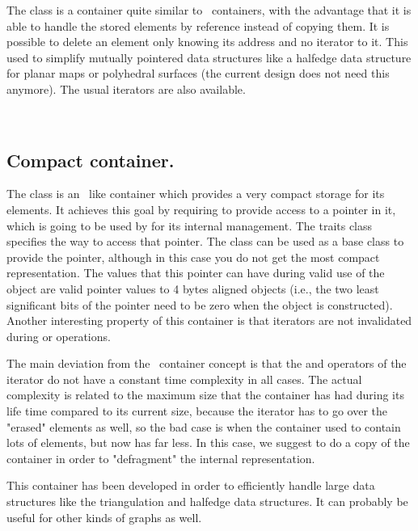 The class  is a container quite similar
to \stl\ containers, with the advantage that it is able to handle the
stored elements by reference instead of copying them. It is possible
to delete an element only knowing its address and no iterator to it.
This used to simplify mutually pointered data structures like a halfedge
data structure for planar maps or polyhedral surfaces (the current design
does not need this anymore). The usual iterators are also available.

\\

\subsection*{Compact container.}

The class  is an \stl\ like container
which provides a very compact storage for its elements.  It achieves this goal
by requiring  to provide access to a pointer in it, which is going to be
used by  for its internal management.
The traits class  specifies the way to
access that pointer.  The class  can be
used as a base class to provide the pointer, although in this case you do not
get the most compact representation.  The values that this pointer can have
during valid use of the object are valid pointer values to 4 bytes aligned
objects (i.e., the two least significant bits of the pointer need to be zero
when the object is constructed). Another interesting property of this
container is that iterators are not invalidated during  or
 operations.

The main deviation from the \stl\ container concept is that the \ccc{++} and
\ccc{--} operators of the iterator do not have a constant time complexity in
all cases.  The actual complexity is related to the maximum size that the
container has had during its life time compared to its current size, because
the iterator has to go over the "erased" elements as well, so the bad case is
when the container used to contain lots of elements, but now has far less.  In
this case, we suggest to do a copy of the container in order to "defragment"
the internal representation.

This container has been developed in order to efficiently handle large data
structures like the triangulation and halfedge data structures.  It can
probably be useful for other kinds of graphs as well.

